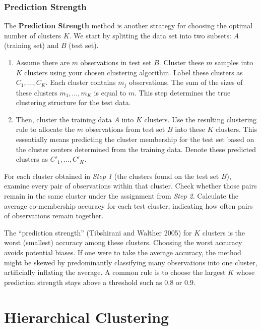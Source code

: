 \documentclass[
]{book}
\begin{document}
\subsubsection*{Prediction Strength}\label{prediction-strength}

The \textbf{Prediction Strength} method is another strategy for choosing the optimal number of clusters \(K\). We start by splitting the data set into two subsets: \(A\) (training set) and \(B\) (test set).

\begin{enumerate}
\def\labelenumi{\arabic{enumi}.}
\item
  Assume there are \(m\) observations in test set \(B\). Cluster these \(m\) samples into \(K\) clusters using your chosen clustering algorithm. Label these clusters as \(C_1, \ldots, C_K\). Each cluster contains \(m_j\) observations. The sum of the sizes of these clusters \(m_1, \ldots, m_K\) is equal to \(m\). This step determines the true clustering structure for the test data.
\item
  Then, cluster the training data \(A\) into \(K\) clusters. Use the resulting clustering rule to allocate the \(m\) observations from test set \(B\) into these \(K\) clusters. This essentially means predicting the cluster membership for the test set based on the cluster centers determined from the training data. Denote these predicted clusters as \(C'_1, \ldots, C'_K\).
\end{enumerate}

For each cluster obtained in \emph{Step 1} (the clusters found on the test set \(B\)), examine every pair of observations within that cluster. Check whether those pairs remain in the same cluster under the assignment from \emph{Step 2}. Calculate the average co-membership accuracy for each test cluster, indicating how often pairs of observations remain together.

The ``prediction strength'' (Tibshirani and Walther 2005) for \(K\) clusters is the worst (smallest) accuracy among these clusters. Choosing the worst accuracy avoids potential biases. If one were to take the average accuracy, the method might be skewed by predominantly classifying many observations into one cluster, artificially inflating the average. A common rule is to choose the largest \(K\) whose prediction strength stays above a threshold such as \(0.8\) or \(0.9\).

\section{Hierarchical Clustering}\label{hierarchical-clustering}
\end{document}
